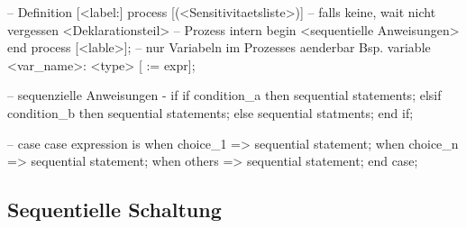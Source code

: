\begin{minipage}{0.01\textwidth}
	\text{ } %
\end{minipage}
\begin{minipage}{0.35\textwidth}
	\begin{VHDL}
--  Definition 
[<label:] process [(<Sensitivitaetsliste>)] -- falls keine, wait nicht vergessen
	<Deklarationsteil> -- Prozess intern
begin 
	{<sequentielle Anweisungen>}
end process [<lable>];
-- nur Variabeln im Prozesses aenderbar Bsp.
variable <var_name>: <type> [ := expr]; 
	\end{VHDL}
\end{minipage}
\begin{minipage}{0.02\textwidth}
	\text{ } %
\end{minipage}
\begin{minipage}{0.26\textwidth}
	\begin{VHDL}
-- sequenzielle Anweisungen - if
if condition_a then 
	{sequential statements};
{elsif condition_b then
	{sequential statements};}
else 
	{sequential statments};
end if;

	\end{VHDL}
\end{minipage}
\begin{minipage}{0.02\textwidth}
	\text{ } %
\end{minipage}
\begin{minipage}{0.32\textwidth}
	\begin{VHDL}
-- case
case expression is 
	when choice_1 	=> {sequential statement};
	{when choice_n	=> {sequential statement};}
	when others	  	=> {sequential statement};
end case;
	\end{VHDL}
\end{minipage}


\subsection{Sequentielle Schaltung}

